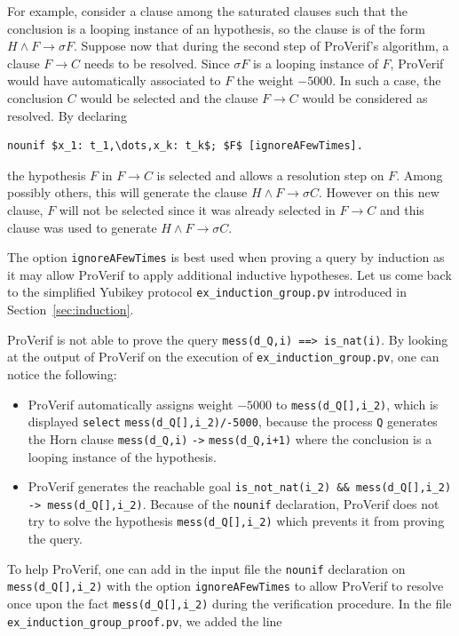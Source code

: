 \documentclass{book}
\begin{document}
\begin{itemize}
For example, consider a clause among the saturated clauses such that the conclusion is a looping instance of an hypothesis, so the clause is of the form $H \wedge F \rightarrow \sigma F$. Suppose now that during the second step of ProVerif's algorithm, a clause $F \rightarrow C$ needs to be resolved. Since $\sigma F$ is a looping instance of $F$, ProVerif would have automatically associated to $F$ the weight $-5000$. In such a case, the conclusion $C$ would be selected and the clause $F \rightarrow C$ would be considered as resolved. By declaring
\begin{lstlisting}[numbers=none]
	nounif $x_1: t_1,\dots,x_k: t_k$; $F$ [ignoreAFewTimes].
\end{lstlisting}
the hypothesis $F$ in $F \rightarrow C$ is selected and allows a resolution step on $F$. Among possibly others, this will generate the clause $H \wedge F \rightarrow \sigma C$. However on this new clause, $F$ will not be selected since it was already selected in $F \rightarrow C$ and this clause was used to generate $H \wedge F \rightarrow \sigma C$.

The option \lstinline!ignoreAFewTimes! is best used when proving a query by induction as it may allow ProVerif to apply additional inductive hypotheses. Let us come back to the simplified Yubikey protocol \texttt{{\docexdir}ex\_induction\_group.pv} introduced in Section~\ref{sec:induction}.



ProVerif is not able to prove the query \lstinline!mess(d_Q,i) ==> is_nat(i)!. By looking at the output of ProVerif on the execution of \texttt{{\docexdir}ex\_induction\_group.pv}, one can notice the following:
\begin{itemize}
\item ProVerif automatically assigns weight $-5000$ to \lstinline!mess(d_Q[],i_2)!, which is displayed \lstinline!select! \lstinline!mess(d_Q[],i_2)/-5000!, because the process \lstinline!Q! generates the Horn clause \lstinline!mess(d_Q,i)! \lstinline!->! \lstinline!mess(d_Q,i+1)! where the conclusion is a looping instance of the hypothesis.
\item ProVerif generates the reachable goal \lstinline!is_not_nat(i_2) && mess(d_Q[],i_2) -> mess(d_Q[],i_2)!. Because of the \lstinline!nounif! declaration, ProVerif does not try to solve the hypothesis \lstinline!mess(d_Q[],i_2)! which prevents it from proving the query.
\end{itemize}
To help ProVerif, one can add in the input file the \lstinline!nounif! declaration on \lstinline!mess(d_Q[],i_2)! with the option \lstinline!ignoreAFewTimes! to allow ProVerif to resolve once upon the fact \lstinline!mess(d_Q[],i_2)! during the verification procedure. In the file \texttt{{\docexdir}ex\_induction\_group\_proof.pv}, we added the line


\end{itemize}
\end{document}
